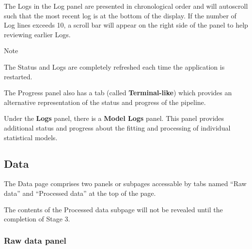 \documentclass[
  8pt,
  a4paper]{article}
\begin{document}
The Logs in the Log panel are presented in chronological order and will
autoscroll such that the most recent log is at the bottom of the
display. If the number of Log lines exceeds 10, a scroll bar will appear
on the right side of the panel to help reviewing earlier Logs.

\begin{tcolorbox}[enhanced jigsaw, colback=white, bottomrule=.15mm, toprule=.15mm, opacityback=0, rightrule=.15mm, left=2mm, leftrule=.75mm, arc=.35mm, breakable, colframe=quarto-callout-color-frame]

Note

The Status and Logs are completely refreshed each time the application
is restarted.

\end{tcolorbox}

The Progress panel also has a tab (called \textbf{Terminal-like}) which
provides an alternative representation of the status and progress of the
pipeline.

Under the \textbf{Logs} panel, there is a \textbf{Model Logs} panel.
This panel provides additional status and progress about the fitting and
processing of individual statistical models.

\subsection{Data}\label{sec-data}

The Data page comprises two panels or subpages accessable by tabs named
``Raw data'' and ``Processed data'' at the top of the page.

\begin{tcolorbox}[enhanced jigsaw, coltitle=black, rightrule=.15mm, left=2mm, leftrule=.75mm, colframe=quarto-callout-note-color-frame, colback=white, bottomrule=.15mm, toprule=.15mm, bottomtitle=1mm, opacityback=0, toptitle=1mm, colbacktitle=quarto-callout-note-color!10!white, titlerule=0mm, arc=.35mm, title=\textcolor{quarto-callout-note-color}{\faInfo}\hspace{0.5em}{Note}, breakable, opacitybacktitle=0.6]

The contents of the Processed data subpage will not be revealed until
the completion of Stage 3.

\end{tcolorbox}

\subsubsection{Raw data panel}\label{raw-data-panel}
\end{document}
